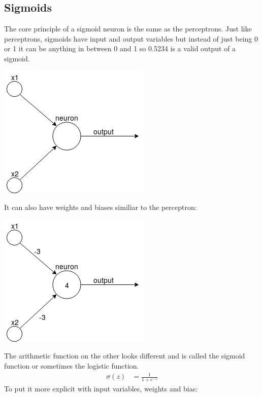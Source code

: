 \subsection{Sigmoids}
The core principle of a sigmoid neuron is the same as the perceptrons. Just like perceptrons, sigmoids have input and output variables but
instead of just being 0 or 1 it can be anything in between 0 and 1 so 0.5234 is a valid output of a sigmoid.
\begin{center}
    \includegraphics[scale=0.5]{images/simple_neuron.png}
\end{center}
It can also have weights and biases similiar to the perceptron:
\begin{center}
    \includegraphics[scale=0.5]{images/simple_neuron_bias.png}
\end{center}
The arithmetic function on the other looks different and is called the sigmoid function or sometimes the logistic function.
\vspace{0.5cm}
\begin{equation*}
    \begin{split}
        \sigma(z) & = \frac{1}{1+e^{-z}}
    \end{split}
\end{equation*}
\vspace{0.5cm}
To put it more explicit with input variables, weights and bias:

